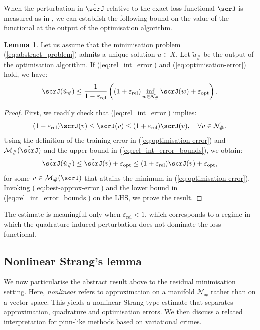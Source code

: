 \documentclass[oneside,reqno,11pt,a4paper]{amsart}
\theoremstyle{definition}
\newtheorem{lemma}{Lemma}[section]
\begin{document}
When the perturbation in $\tilde{\scrJ}$ relative to the exact loss
functional $\scrJ$ is measured as in
, we can establish the following bound on
the value of the functional at the output of the optimisation algorithm.
\begin{lemma} \label{lemma:nonlinear-strang-rel-pert}
  Let us assume that the minimisation problem (\ref{eq:abstract_problem}) admits a unique solution $u \in X$. Let $\tilde{u}_{\#}$ be the output of the optimisation algorithm. If (\ref{eq:rel_int_error}) and (\ref{eq:optimisation-error}) hold, we have:
  \[
    \scrJ(\tilde{u}_{\#}) \leq  \frac{1}{1 - \varepsilon_{\mathrm{rel}}} \left((1 + \varepsilon_{\mathrm{rel}}) \inf_{w \in \mathcal{N}_{\#}} \scrJ(w) + \varepsilon_{\mathrm{opt}} \right).
  \]
\end{lemma}
\begin{proof}
First, we readily check that (\ref{eq:rel_int_error}) implies:
\begin{equation}\label{eq:rel_int_error_bounds}
  (1 - \varepsilon_{\mathrm{rel}}) \scrJ(v) \leq \tilde{\scrJ}(v) \leq (1 + \varepsilon_{\mathrm{rel}}) \scrJ(v), \quad \forall v \in \mathcal{N}_{\#}.
\end{equation}
Using the definition of the training error in (\ref{eq:optimisation-error}) and $\mathcal{M}_{\#}(\tilde \scrJ)$ and the upper bound in (\ref{eq:rel_int_error_bounds}), we obtain:
\begin{equation} \label{eq:rel-pert-abstract-strang}
  \tilde{\scrJ}(\tilde{u}_{\#})
  \leq \tilde{\scrJ}(v) + \varepsilon_{\mathrm{opt}} 
  \leq (1 + \varepsilon_{\mathrm{rel}}) \scrJ(v) + \varepsilon_{\mathrm{opt}}, 
\end{equation}
for some $v \in \mathcal{M}_{\#}(\tilde{\scrJ})$ that attains the minimum in
(\ref{eq:optimisation-error}). Invoking (\ref{eq:best-approx-error}) and the
lower bound in (\ref{eq:rel_int_error_bounds}) on the LHS, we prove the result.
\end{proof}
The estimate is meaningful only when $\varepsilon_{\mathrm{rel}} < 1$, which corresponds to a regime in which the quadrature-induced perturbation does not dominate the loss functional.
\subsection{Nonlinear Strang's lemma} \label{subsec:nonlinear-strang-lemma}

We now particularise the abstract result above to the residual minimisation
setting. Here, \emph{nonlinear} refers to approximation on a
manifold $\mathcal{N}_{\#}$ rather than on a vector space. This yields a
nonlinear Strang-type estimate that separates approximation, quadrature and
optimisation errors. We then discuss a related interpretation for \ac{pinn}-like
methods based on variational crimes.
\end{document}
